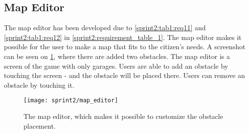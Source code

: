 \subsection{Map Editor}
The map editor has been developed due to \cref{sprint2:tab1:req11} and \cref{sprint2:tab1:req12} in \cref{sprint2:requirement_table_1}.
The map editor makes it possible for the user to make a map that fits to the citizen's needs.
A screenshot can be seen on \cref{fig:sprint2:map_editor}, where there are added two obstacles.
The map editor is a screen of the game with only garages.
Users are able to add an obstacle by touching the screen - and the obstacle will be placed there.
Users can remove an obstacle by touching it.

\begin{figure}[h]
\texttt{[image: sprint2/map\_editor]}
\caption{The map editor, which makes it possible to customize the obstacle placement.}
\label{fig:sprint2:map_editor}
\end{figure}
 
